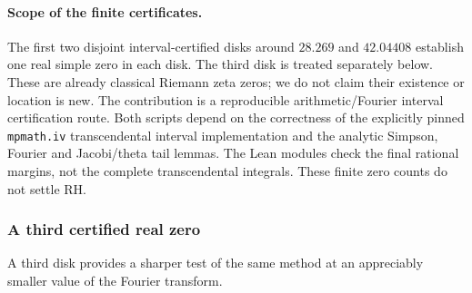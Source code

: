 \paragraph{Scope of the finite certificates.}
The first two disjoint
interval-certified disks around
$28.269$ and $42.04408$
establish one real simple zero
in each disk. The third disk
is treated separately below. These are already
classical Riemann zeta zeros;
we do not claim their
existence or location is new.
The contribution is a
reproducible arithmetic/Fourier
interval certification route.
Both scripts depend on the
correctness of the explicitly
pinned \texttt{mpmath.iv}
transcendental interval
implementation and the
analytic Simpson, Fourier
and Jacobi/theta tail lemmas.
The Lean modules check the
final rational margins,
not the complete
transcendental integrals.
These finite zero counts
do not settle RH.

\subsubsection{A third certified real zero}
\label{subsec:thirdzerocert}
A third disk provides a sharper
test of the same method at an
appreciably smaller value of the
Fourier transform.


